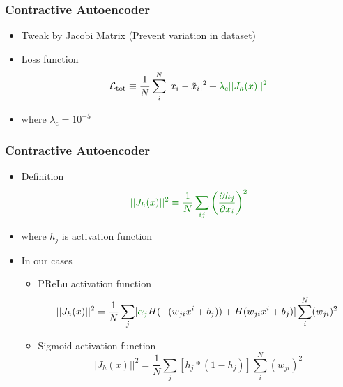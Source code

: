\documentclass{beamer}
\begin{document}
\begin{frame}
\frametitle{Contractive Autoencoder}

\begin{itemize}
    \item Tweak by \textcolor[RGB]{0,128,0}{Jacobi Matrix (Prevent variation in dataset)}
    \item Loss function
    \begin{equation}
        \mathcal{L}_{\text{tot}} \equiv \frac{1}{N}\sum_i^N |x_i-\tilde{x}_i|^2 + \textcolor[RGB]{0,128,0}{\lambda_{\text{c}}||J_h(x)||^2}
    \end{equation}
    \item where $\lambda_{\text{c}} = 10^{-5}$
\end{itemize}
\end{frame}
\begin{frame}
\frametitle{Contractive Autoencoder}
\begin{itemize}
    \item Definition
    \begin{equation}
        \textcolor[RGB]{0,128,0}{||J_h(x)||^2 \equiv \frac{1}{N}\sum_{ij}\left(\frac{\partial h_j}{\partial x_i}\right)^2}
    \end{equation}
    \item where $h_j$ is activation function
    \item In our cases
    \begin{itemize}
        \item PReLu activation function
        \begin{equation}
            ||J_h(x)||^2 = \frac{1}{N}\sum_j[\textcolor[RGB]{0,128,0}{\alpha_j}H(-(w_{ji}x^i+b_j)) + H(w_{ji}x^i+b_j)]\sum_i^N(w_{ji})^2
        \end{equation}
        \item Sigmoid activation function
        \begin{equation}
            ||J_h(x)||^2 = \frac{1}{N}\sum_j[h_j*(1-h_j)]\sum_i^N(w_{ji})^2
        \end{equation}
    \end{itemize}
\end{itemize}

\end{frame}
\end{document}
